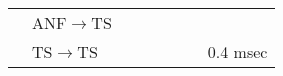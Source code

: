 \begin{longtable}{cXXXXXXX}
 \citep{BahmerLangner:2006,BahmerLangner:2006a}  &  ANF\ensuremath{\rightarrow}TS  &                                                                                                                    &                                                           &                                           &                                                                                 &                                           & \\ 
                                                 &  TS\ensuremath{\rightarrow}TS   &                                                                                                                    &                                                           &                                           &                                                                                 &                                           & 0.4 msec\\ \midrule


\end{longtable}
